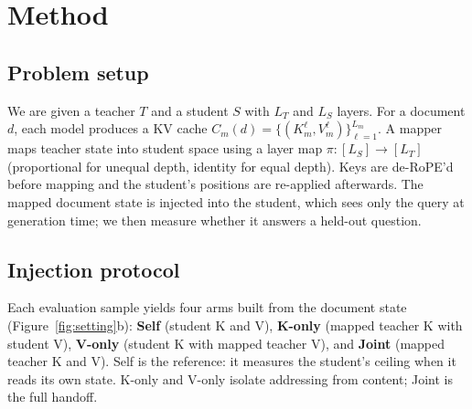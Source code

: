 \documentclass[11pt]{article}
\begin{document}
\section{Method}

\subsection{Problem setup}
\label{sec:problem-setup}
We are given a teacher $T$ and a student $S$ with $L_T$ and $L_S$ layers. For a
document $d$, each model produces a KV cache
$C_m(d)=\{(K_m^\ell,V_m^\ell)\}_{\ell=1}^{L_m}$. A mapper maps teacher state into
student space using a layer map $\pi:[L_S]\to[L_T]$ (proportional for unequal
depth, identity for equal depth). Keys are de-RoPE'd before mapping and the
student's positions are re-applied afterwards. The mapped document state is
injected into the student, which sees only the query at generation time; we then
measure whether it answers a held-out question.

\subsection{Injection protocol}
\label{sec:injection}
Each evaluation sample yields four arms built from the document state
(Figure~\ref{fig:setting}b):
\textbf{Self} (student K and V), \textbf{K-only} (mapped teacher K with student
V), \textbf{V-only} (student K with mapped teacher V), and \textbf{Joint}
(mapped teacher K and V). Self is the reference: it measures the student's
ceiling when it reads its own state. K-only and V-only isolate addressing from
content; Joint is the full handoff.
\end{document}
